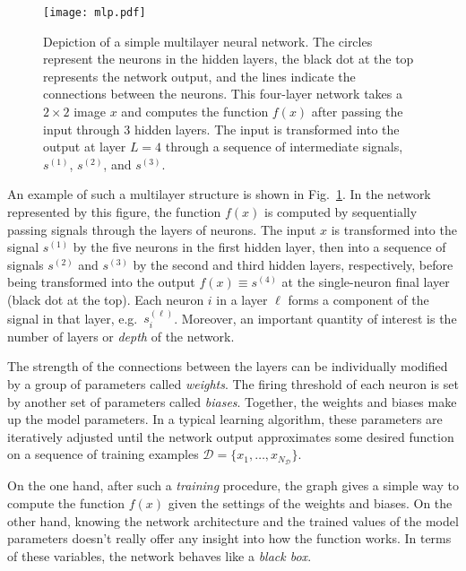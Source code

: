 \documentclass[12pt]{article}
\begin{document}
\begin{figure}[h]
\begin{center}
\texttt{[image: mlp.pdf]}
\caption{Depiction of a simple multilayer neural network. The circles represent the neurons in the hidden layers, the black dot at the top represents the network output, and the lines indicate the connections between the neurons. This four-layer network takes a $2 \times 2$ image $x$ and computes the function $f(x)$ after passing the input through 3 hidden layers. The input is transformed into the output at layer $L=4$ through a sequence of intermediate signals, $s^{(1)}$, $s^{(2)}$, and $s^{(3)}$.
}
\label{fig:mlp}
\end{center}
\end{figure}





An example of such a multilayer structure is shown in Fig.~\ref{fig:mlp}. In the network represented by this figure, the function $f(x)$ is computed by sequentially passing signals through the layers of neurons. The input $x$ is transformed into the signal $s^{(1)}$ by the five neurons in the first hidden layer, then into a sequence of signals $s^{(2)}$ and $s^{(3)}$ by the second and third hidden layers, respectively, before being transformed into the output $f(x) \equiv s^{(4)}$ at the single-neuron final layer (black dot at the top). Each neuron $i$ in a layer $\ell$ forms a component of the signal in that layer, e.g.~$s_i^{(\ell)}$. Moreover, an important quantity of interest is the number of layers or \emph{depth} of the network.

The strength of the connections between the layers can be individually modified by a group of parameters called \emph{weights}. The firing threshold of each neuron is set by another set of parameters called \emph{biases}. Together, the weights and biases make up the model parameters.
In a typical learning algorithm,  these parameters are iteratively adjusted until the network output approximates some desired function on a sequence of training examples $\mathcal{D} = \{x_1, \dots, x_{N_\mathcal{D}} \}$. 

On the one hand, after such a \emph{training} procedure, the graph gives a simple way to compute the function $f(x)$ given the settings of the weights and biases. On the other hand, knowing the network architecture and the trained values of the model parameters doesn't really offer any insight into how the function works. In terms of these 
variables, the network behaves like a \emph{black box}.
\end{document}
